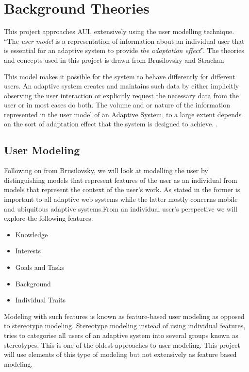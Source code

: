 \section{Background Theories} \label{sub:theories}
This project approaches AUI, extensively using the user modelling technique. ``The \emph{user model} is a representation of information about an individual user that is essential for an adaptive system to provide \emph{the adaptation effect}''\cite{brusilovsky2007user}. The theories and concepts used in this project is drawn from Brusilovsky \cite{brusilovsky2007user} and Strachan \cite{strachan2000minimalist}

This model makes it possible for the system to behave differently for different users. An adaptive system creates and maintains such data by either implicitly observing the user interaction or explicitly request the necessary data from the user or in most cases do both. The volume and or nature of the information represented in the user model of an Adaptive System, to a large extent depends on the sort of adaptation effect that the system is designed to achieve. \cite{brusilovsky2007user}.
\subsection{User Modeling}
Following on from Brusilovsky, we will look at modelling the user by distinguishing models that represent features of the user as an individual from models that represent the context of the user's work. As stated in \cite{brusilovsky2007user} the former is important to all adaptive web systems while the latter mostly concerns mobile and ubiquitous adaptive systems.From an individual user's perspective we will explore the following features:
\begin{itemize}
\item Knowledge
\item Interests
\item Goals and Tasks
\item Background
\item Individual Traits
\end{itemize}

Modeling with such features is known as feature-based user modeling as opposed to stereotype modeling. Stereotype modeling instead of using individual features, tries to categorise all users of an adaptive system into several groups known as stereotypes. This is one of the oldest approaches to user modeling. This project will use elements of this type of modeling but not extensively as feature based modeling.

